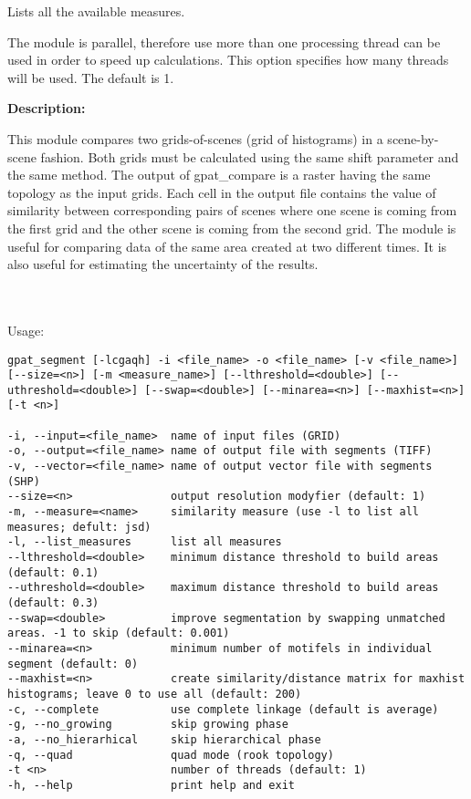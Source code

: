 
Lists all the available measures.


The module is parallel, therefore use more than one processing thread can be used in order to speed up calculations. 
This option specifies how many threads will be used. 
The default is 1.

{\bf Description:}

This module compares two grids-of-scenes (grid of histograms) in a scene-by-scene fashion. 
Both grids must be calculated using the same shift parameter and the same method.
The output of gpat\_compare is a raster having the same topology as the input grids.
Each cell in the output file contains the value of similarity between corresponding pairs of scenes where one scene is coming from the first grid and the other scene is coming from the second grid.
The module is useful for comparing data of the same area created at two different times.
It is also useful for estimating the uncertainty of the results.

{}
\\\\
Usage:

\begin{minipage}{\linewidth}
\begin{lstlisting}
gpat_segment [-lcgaqh] -i <file_name> -o <file_name> [-v <file_name>] [--size=<n>] [-m <measure_name>] [--lthreshold=<double>] [--uthreshold=<double>] [--swap=<double>] [--minarea=<n>] [--maxhist=<n>] [-t <n>]

-i, --input=<file_name>  name of input files (GRID)
-o, --output=<file_name> name of output file with segments (TIFF)
-v, --vector=<file_name> name of output vector file with segments (SHP)
--size=<n>               output resolution modyfier (default: 1)
-m, --measure=<name>     similarity measure (use -l to list all measures; defult: jsd)
-l, --list_measures      list all measures
--lthreshold=<double>    minimum distance threshold to build areas (default: 0.1)
--uthreshold=<double>    maximum distance threshold to build areas (default: 0.3)
--swap=<double>          improve segmentation by swapping unmatched areas. -1 to skip (default: 0.001)
--minarea=<n>            minimum number of motifels in individual segment (default: 0)
--maxhist=<n>            create similarity/distance matrix for maxhist histograms; leave 0 to use all (default: 200)
-c, --complete           use complete linkage (default is average)
-g, --no_growing         skip growing phase
-a, --no_hierarhical     skip hierarchical phase
-q, --quad               quad mode (rook topology)
-t <n>                   number of threads (default: 1)
-h, --help               print help and exit
\end{lstlisting}
\end{minipage}

